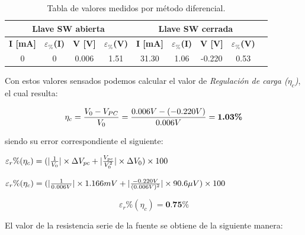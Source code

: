 \documentclass{article}
\begin{document}
\begin{table}[!hbt]
	\begin{center}

		\begin{tabular}{|c|c|c|c|c|c|c|c|c|} \hline
			\multicolumn{4}{|c|}{\textbf{Llave SW abierta}} & \multicolumn{4}{c|}{\textbf{Llave SW cerrada}} \\ \hline
			\textbf{I [mA]} & \textbf{$\varepsilon_{\%}$(I)} & \textbf{V [V]} & \textbf{$\varepsilon_{\%}$(V)} & \textbf{I [mA]} & \textbf{$\varepsilon_{\%}$(I)} & \textbf{V [V]} & \textbf{$\varepsilon_{\%}$(V)} \\\cline{1-8}
			0 & 0 & 0.006 & 1.51 & 31.30 & 1.06 & -0.220 & 0.53 \\\cline{1-8}
		\end{tabular}

	\caption{Tabla de valores medidos por método diferencial.}
	\end{center}
\end{table}
\bigskip



Con estos valores sensados podemos calcular el valor de \textit{Regulación de carga ($\eta_c$)}, el cual resulta:
\bigskip

\begin{equation}
 	\eta_c = {V_0 - V_{PC} \over V_0} = {0.006V - (-0.220V) \over 0.006V} = \textbf{1.03\%}
\end{equation}
\bigskip


\noindent siendo su error correspondiente el siguiente:
\bigskip

\begin{center}
	$\varepsilon_r\%(\eta_c) = (|{1 \over V_{0}}| \times \Delta V_{pc} + |{V_{pc} \over V_{0}^2}| \times \Delta V_{0})\times 100 $ \\
\end{center}

\begin{center}
	$\varepsilon_r\%(\eta_c) = (|{1 \over 0.006V}| \times 1.166mV + |{-0.220V \over (0.006V)^2}| \times 90.6\mu V)\times 100$ \\
\end{center}

\begin{equation}
	\varepsilon_r\%(\eta_c) = \textbf{0.75\%}
\end{equation}

\bigskip\bigskip


\noindent El valor de la resistencia serie de la fuente se obtiene de la siguiente manera:
\bigskip
\end{document}
